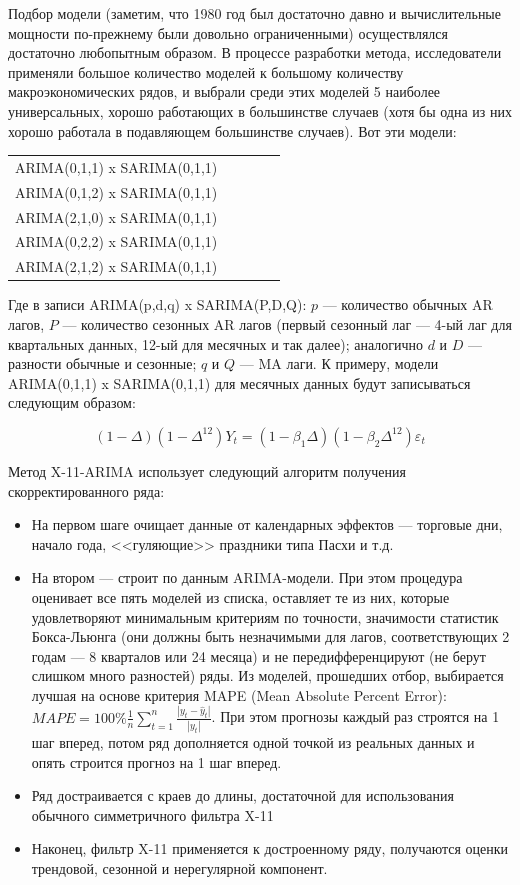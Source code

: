 \documentclass[final,pdftex]{../../template/epsilonj}\usepackage[]{graphicx}\usepackage[]{color}
\begin{document}
Подбор модели (заметим, что 1980 год был достаточно давно и вычислительные мощности по-прежнему были довольно ограниченными) осуществлялся достаточно любопытным образом. В процессе разработки метода, исследователи применяли большое количество моделей к большому количеству макроэкономических рядов, и выбрали среди этих моделей 5 наиболее универсальных, хорошо работающих в большинстве случаев (хотя бы одна из них хорошо работала в подавляющем большинстве случаев). Вот эти модели:

\begin{center}
\begin{tabular}{ccccc}
ARIMA(0,1,1) x SARIMA(0,1,1) \\
ARIMA(0,1,2) x SARIMA(0,1,1) \\
ARIMA(2,1,0) x SARIMA(0,1,1) \\
ARIMA(0,2,2) x SARIMA(0,1,1) \\
ARIMA(2,1,2) x SARIMA(0,1,1) \\
\end{tabular}
\end{center}

Где в записи ARIMA(p,d,q) x SARIMA(P,D,Q): $p$ --- количество обычных AR лагов, $P$ --- количество сезонных AR лагов (первый сезонный лаг --- 4-ый лаг для квартальных данных, 12-ый для месячных и так далее); аналогично $d$ и $D$ --- разности обычные и сезонные; $q$ и $Q$ --- MA лаги. К примеру, модели ARIMA(0,1,1) x SARIMA(0,1,1) для месячных данных будут записываться следующим образом:

\[
(1 - \Delta)(1 - \Delta^{12})Y_t = (1 - \beta_1 \Delta)(1 - \beta_2 \Delta^{12}) \varepsilon_t
\]

Метод X-11-ARIMA использует следующий алгоритм получения скорректированного ряда: 

\begin{itemize}
\item На первом шаге очищает данные от календарных эффектов --- торговые дни, начало года, <<гуляющие>> праздники типа Пасхи и т.д.
\item На втором --- строит по данным ARIMA-модели. При этом процедура оценивает все пять моделей из списка, оставляет те из них, которые удовлетворяют минимальным критериям по точности, значимости статистик Бокса-Льюнга (они должны быть незначимыми для лагов, соответствующих 2 годам --- 8 кварталов или 24 месяца) и не передифференцируют (не берут слишком много разностей) ряды. Из моделей, прошедших отбор, выбирается лучшая на основе критерия MAPE (Mean Absolute Percent Error): $MAPE = 100\% \frac{1}{n} \sum_{t = 1}^n \frac{|y_t - \hat{y}_t|}{|y_t|}$. При этом прогнозы каждый раз строятся на 1 шаг вперед, потом ряд дополняется одной точкой из реальных данных и опять строится прогноз на 1 шаг вперед. 
\item Ряд достраивается с краев до длины, достаточной для использования обычного симметричного фильтра X-11
\item Наконец, фильтр X-11 применяется к достроенному ряду, получаются оценки трендовой, сезонной и нерегулярной компонент. 
\end{itemize}
\end{document}
